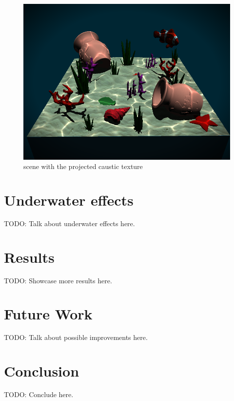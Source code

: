 \documentclass{article}
\begin{document}
\begin{figure}[h]
 \includegraphics[width=\columnwidth]{imgs/scene_with_caustics.png}
 \caption{scene with the projected caustic texture}
 \label{fig:scene_with_caustics}
\end{figure}

\section{Underwater effects}
\label{sec:underwater}

TODO: Talk about underwater effects here.

\section{Results}

TODO: Showcase more results here.

\section{Future Work}

TODO: Talk about possible improvements here.

\section{Conclusion}

TODO: Conclude here.

\newpage
\appendix




\end{document}
